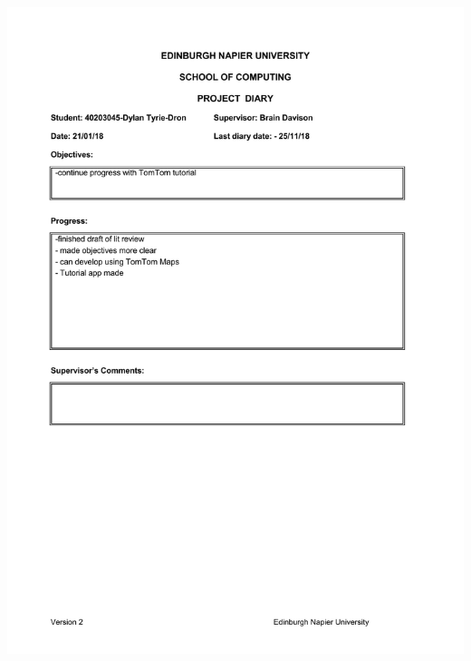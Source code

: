 \documentclass[12pt,a4paper]{article}
\begin{document}
\begin{appendices}
\includegraphics[width=\textwidth,height=\textheight,keepaspectratio]{project_diary_9th_entry.pdf}

\end{appendices}
\end{document}
